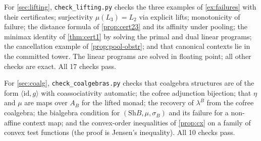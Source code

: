 \documentclass[11pt]{article}
\theoremstyle{definition}
\theoremstyle{remark}
\newcommand{\Sh}{\mathrm{Sh}}
\newcommand{\id}{\mathrm{id}}
\begin{document}
For \cref{sec:lifting}, \texttt{check\_lifting.py} checks the three examples of
\cref{ex:failures} with their certificates; surjectivity $\mu(L_3)=L_2$ via explicit lifts;
monotonicity of failure; the distance formula of \cref{prop:cert23} and its affinity under pooling;
the minimax identity of \cref{thm:cert1} by solving the primal and dual linear programs; the
cancellation example of \cref{prop:pool-obstr}; and that canonical contexts lie in the committed
tower. The linear programs are solved in floating point; all other checks are exact. All 17 checks
pass.

For \cref{sec:coalg}, \texttt{check\_coalgebras.py} checks that coalgebra structures are of the form
$\langle\id,g\rangle$ with coassociativity automatic; the cofree adjunction bijection; that $\eta$ and
$\mu$ are maps over $A_B$ for the lifted monad; the recovery of $\lambda^B$ from the cofree coalgebra;
the bialgebra condition for $(\Sh B,\mu,\sigma_B)$ and its failure for a non-affine context map; and
the convex-order inequalities of \cref{prop:cx} on a family of convex test functions (the proof is
Jensen's inequality). All 10 checks pass.
\end{document}
